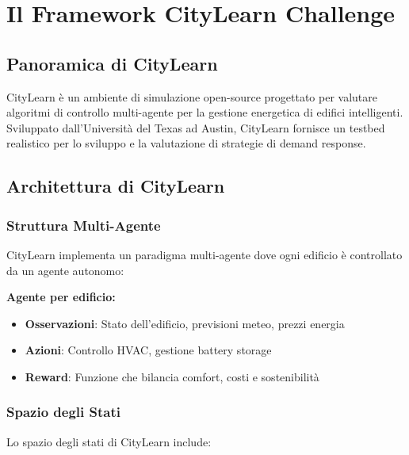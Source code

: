 \documentclass[12pt,a4paper,twoside]{report}
\begin{document}
\section{Il Framework CityLearn Challenge}

\subsection{Panoramica di CityLearn}

CityLearn è un ambiente di simulazione open-source progettato per valutare algoritmi di controllo multi-agente per la gestione energetica di edifici intelligenti. Sviluppato dall'Università del Texas ad Austin, CityLearn fornisce un testbed realistico per lo sviluppo e la valutazione di strategie di demand response.

\subsection{Architettura di CityLearn}

\subsubsection{Struttura Multi-Agente}

CityLearn implementa un paradigma multi-agente dove ogni edificio è controllato da un agente autonomo:

\textbf{Agente per edificio:}
\begin{itemize}
    \item \textbf{Osservazioni}: Stato dell'edificio, previsioni meteo, prezzi energia
    \item \textbf{Azioni}: Controllo HVAC, gestione battery storage
    \item \textbf{Reward}: Funzione che bilancia comfort, costi e sostenibilità
\end{itemize}

\subsubsection{Spazio degli Stati}

Lo spazio degli stati di CityLearn include:
\end{document}
